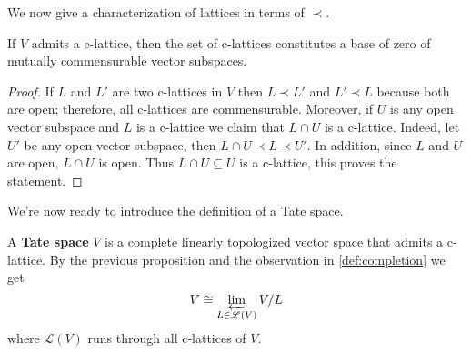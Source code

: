 We now give a characterization of lattices in terms of $\prec$.
\begin{proposition}\label{prop:lattices-are-basis}
	If $V$ admits a c-lattice, then the set of c-lattices constitutes a base of zero of mutually commensurable vector subspaces.
\end{proposition}
\begin{proof}
	If $L$ and $L'$ are two c-lattices in $V$ then $L \prec L'$ and $L' \prec L$ because both are open; therefore, all c-lattices are commensurable. Moreover, if $U$ is any open vector subspace and $L$ is a c-lattice we claim that $L \cap U$ is a c-lattice. Indeed, let $U'$ be any open vector subspace, then $L\cap U \prec L\prec U'$. In addition, since $L$ and $U$ are open, $L \cap U$ is open. Thus $L \cap U \subseteq U$ is a c-lattice, this proves the statement.
\end{proof}
We're now ready to introduce the definition of a Tate space.
\begin{definition}\label{def:tate-vector-space}
	A \textbf{Tate space} $V$ is a complete linearly topologized vector space that admits a c-lattice. By the previous proposition and the observation in \cref{def:completion} we get
	\[
		V \cong \varprojlim_{L \in \mathscr{L}(V)} V/L
	\]
	where $\mathscr{L}(V)$ runs through all c-lattices of $V$.
\end{definition}
